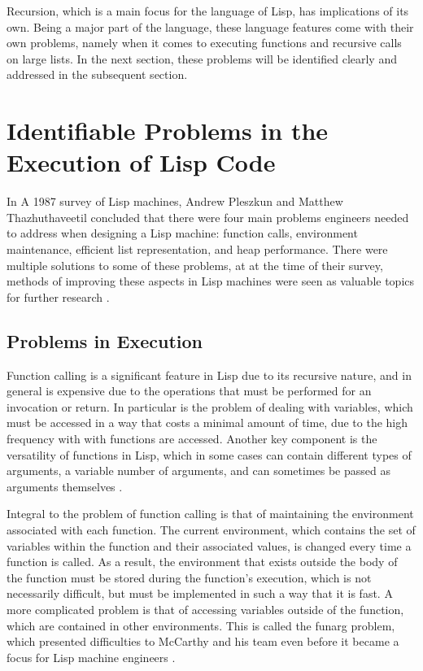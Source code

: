 \documentclass[journal]{IEEEtran}
\begin{document}
Recursion, which is a main focus for the language of Lisp, has implications of its own. Being a major part of the language, these language features come with their own problems, namely when it comes to executing functions and recursive calls on large lists. In the next section, these problems will be identified clearly and addressed in the subsequent section.

\section{Identifiable Problems in the Execution of Lisp Code}
In A 1987 survey of Lisp machines, Andrew Pleszkun and Matthew Thazhuthaveetil concluded that there were four main problems engineers needed to address when designing a Lisp machine: function calls, environment maintenance, efficient list representation, and heap performance. There were multiple solutions to some of these problems, at at the time of their survey, methods of improving these aspects in Lisp machines were seen as valuable topics for further research \cite{pt}.

\subsection{Problems in Execution}
Function calling is a significant feature in Lisp due to its recursive nature, and in general is expensive due to the operations that must be performed for an invocation or return. In particular is the problem of dealing with variables, which must be accessed in a way that costs a minimal amount of time, due to the high frequency with with functions are accessed. Another key component is the versatility of functions in Lisp, which in some cases can contain different types of arguments, a variable number of arguments, and can sometimes be passed as arguments themselves \cite{pt}.

Integral to the problem of function calling is that of maintaining the environment associated with each function. The current environment, which contains the set of variables within the function and their associated values, is changed every time a function is called. As a result, the environment that exists outside the body of the function must be stored during the function's execution, which is not necessarily difficult, but must be implemented in such a way that it is fast. A more complicated problem is that of accessing variables outside of the function, which are contained in other environments. This is called the funarg problem, which presented difficulties to McCarthy and his team even before it became a focus for Lisp machine engineers \cite{stoyan, pt}.
\end{document}
